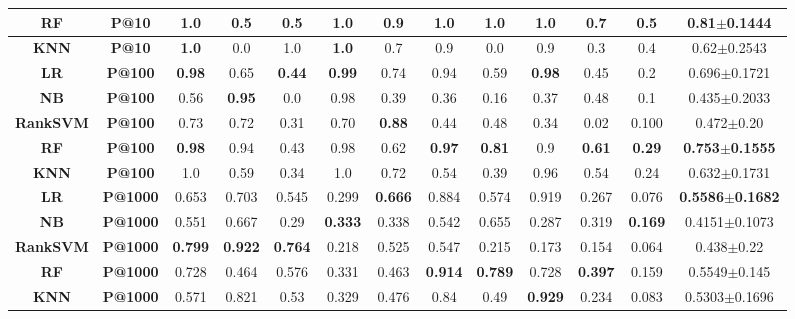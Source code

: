 \begin{table}[t!]
{{\begin{tabular}{|c|c|c|c|c|c|c|c|c|c|c|c|c|}
\hline 
\textbf{RF} & \textbf{P@10} & \textbf{1.0} & 0.5 & 0.5 & \textbf{1.0} & \textbf{0.9} & \textbf{1.0} & \textbf{1.0} & \textbf{1.0} & \textbf{0.7} & 0.5 & \textbf{0.81$\pm$0.1444}\tabularnewline
\hline 
\textbf{KNN} & \textbf{P@10} & \textbf{1.0} & 0.0 & 1.0 & \textbf{1.0} & 0.7 & 0.9 & 0.0 & 0.9 & 0.3 & 0.4 & 0.62$\pm$0.2543\tabularnewline
\hline 
\hline 
\textbf{LR} & \textbf{P@100} & \textbf{0.98} & 0.65 & \textbf{0.44} & \textbf{0.99} & 0.74 & 0.94 & 0.59 & \textbf{0.98} & 0.45 & 0.2 & 0.696$\pm$0.1721\tabularnewline
\hline 
\textbf{NB} & \textbf{P@100} & 0.56 & \textbf{0.95} & 0.0 & 0.98 & 0.39 & 0.36 & 0.16 & 0.37 & 0.48 & 0.1 & 0.435$\pm$0.2033\tabularnewline
\hline 
\textbf{RankSVM} & \textbf{P@100} & 0.73 & 0.72 & 0.31 & 0.70 & \textbf{0.88} & 0.44 & 0.48 & 0.34 & 0.02 & 0.100 & 0.472$\pm$0.20\tabularnewline
\hline 
\textbf{RF} & \textbf{P@100} & \textbf{0.98} & 0.94 & 0.43 & 0.98 & 0.62 & \textbf{0.97} & \textbf{0.81} & 0.9 & \textbf{0.61} & \textbf{0.29} & \textbf{0.753$\pm$0.1555}\tabularnewline
\hline 
\textbf{KNN} & \textbf{P@100} & 1.0 & 0.59 & 0.34 & 1.0 & 0.72 & 0.54 & 0.39 & 0.96 & 0.54 & 0.24 & 0.632$\pm$0.1731\tabularnewline
\hline 
\hline 
\textbf{LR} & \textbf{P@1000} & 0.653 & 0.703 & 0.545 & 0.299 & \textbf{0.666} & 0.884 & 0.574 & 0.919 & 0.267 & 0.076 & \textbf{0.5586$\pm$0.1682}\tabularnewline
\hline 
\textbf{NB} & \textbf{P@1000} & 0.551 & 0.667 & 0.29 & \textbf{0.333} & 0.338 & 0.542 & 0.655 & 0.287 & 0.319 & \textbf{0.169} & 0.4151$\pm$0.1073\tabularnewline
\hline 
\textbf{RankSVM} & \textbf{P@1000} & \textbf{0.799} & \textbf{0.922} & \textbf{0.764} & 0.218 & 0.525 & 0.547 & 0.215 & 0.173 & 0.154 & 0.064 & 0.438$\pm$0.22\tabularnewline
\hline 
\textbf{RF} & \textbf{P@1000} & 0.728 & 0.464 & 0.576 & 0.331 & 0.463 & \textbf{0.914} & \textbf{0.789} & 0.728 & \textbf{0.397} & 0.159 & 0.5549$\pm$0.145\tabularnewline
\hline 
\textbf{KNN} & \textbf{P@1000} & 0.571 & 0.821 & 0.53 & 0.329 & 0.476 & 0.84 & 0.49 & \textbf{0.929} & 0.234 & 0.083 & 0.5303$\pm$0.1696\tabularnewline
\hline 
\end{tabular}
}}
\label{table:results2}
\end{table}



